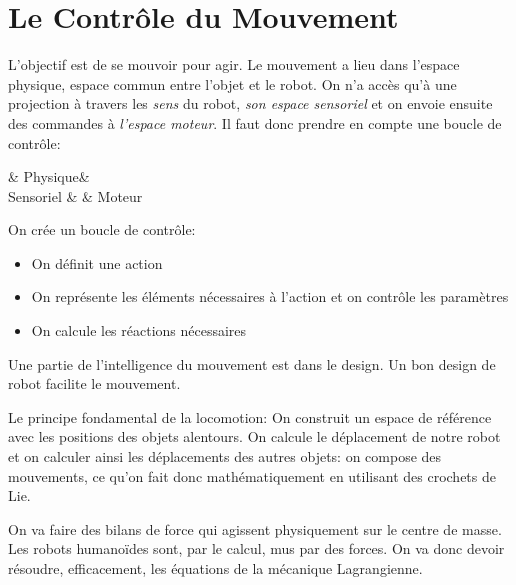 \documentclass[math]{cours}
\begin{document}
\section{Le Contrôle du Mouvement}
L'objectif est de se mouvoir pour agir.
Le mouvement a lieu dans l'espace physique, espace commun entre l'objet et le robot.
On n'a accès qu'à une projection à travers les \textit{sens} du robot, \emph{son espace sensoriel} et on envoie ensuite des commandes à \emph{l'espace moteur}.
Il faut donc prendre en compte une boucle de contrôle:
\begin{category}
	& Physique & \\
Sensoriel  & & Moteur
\end{category}

On crée un boucle de contrôle:
\begin{itemize}
	\item On définit une action
	\item On représente les éléments nécessaires à l'action et on contrôle les paramètres
	\item On calcule les réactions nécessaires
\end{itemize}
Une partie de l'intelligence du mouvement est dans le design.
Un bon design de robot facilite le mouvement.

Le principe fondamental de la locomotion:
On construit un espace de référence avec les positions des objets alentours.
On calcule le déplacement de notre robot et on calculer ainsi les déplacements des autres objets:
on compose des mouvements, ce qu'on fait donc mathématiquement en utilisant des crochets de Lie.

On va faire des bilans de force qui agissent physiquement sur le centre de masse.
Les robots humanoïdes sont, par le calcul, mus par des forces.
On va donc devoir résoudre, efficacement, les équations de la mécanique Lagrangienne.
\end{document}
